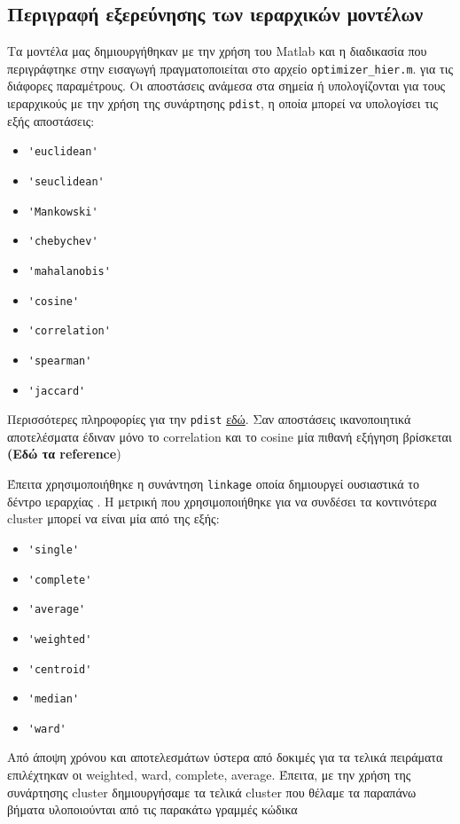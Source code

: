 \subsection{Περιγραφή εξερεύνησης των ιεραρχικών μοντέλων}

Τα μοντέλα μας δημιουργήθηκαν με την χρήση του Matlab και η διαδικασία που περιγράφτηκε στην εισαγωγή πραγματοποιείται στο αρχείο \texttt{optimizer\_hier.m}.
για τις διάφορες παραμέτρους. Οι αποστάσεις ανάμεσα στα σημεία ή υπολογίζονται για τους ιεραρχικούς με την χρήση της συνάρτησης \lstinline!pdist!, η οποία μπορεί να υπολογίσει τις εξής αποστάσεις:
\begin{itemize}
    \item \lstinline!'euclidean'!
    \item \lstinline!'seuclidean'!
    \item \lstinline!'Mankowski'!
    \item \lstinline!'chebychev'!
    \item \lstinline!'mahalanobis'!
    \item \lstinline!'cosine'!
    \item \lstinline!'correlation'!
    \item \lstinline!'spearman'!
    \item \lstinline!'jaccard'!
\end{itemize}

Περισσότερες πληροφορίες για την \lstinline!pdist!
\href{http://www.mathworks.com/help/stats/pdist.html}{εδώ}.
Σαν αποστάσεις ικανοποιητικά αποτελέσματα έδιναν μόνο το correlation και το 
cosine μία πιθανή εξήγηση βρίσκεται \textbf{(Εδώ τα reference})

Έπειτα χρησιμοποιήθηκε η συνάντηση \lstinline!linkage! οποία δημιουργεί ουσιαστικά το δέντρο ιεραρχίας .
Η μετρική που χρησιμοποιήθηκε για να συνδέσει τα κοντινότερα cluster μπορεί να είναι μία από της εξής:
\begin{itemize}
    \item \lstinline!'single'!
    \item \lstinline!'complete'!
    \item \lstinline!'average'!
    \item \lstinline!'weighted'!
    \item \lstinline!'centroid'!
    \item \lstinline!'median'!
    \item \lstinline!'ward'! 
\end{itemize}

Από άποψη χρόνου και αποτελεσμάτων ύστερα από δοκιμές για τα τελικά πειράματα επιλέχτηκαν οι weighted, ward, complete, average.
Έπειτα, με την χρήση της συνάρτησης cluster δημιουργήσαμε τα τελικά cluster που θέλαμε τα παραπάνω βήματα υλοποιούνται από τις παρακάτω γραμμές κώδικα 

